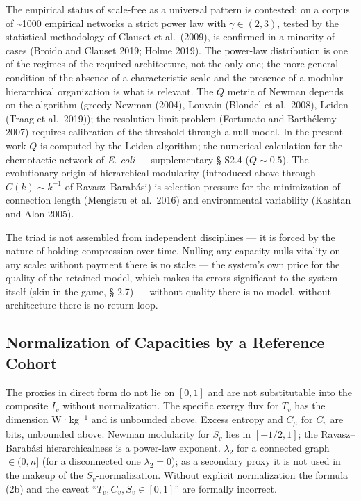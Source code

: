 \documentclass[pdflatex,sn-mathphys-ay]{sn-jnl}
\begin{document}
The empirical status of scale-free as a universal pattern is contested: on a corpus of \textasciitilde1000 empirical networks a strict power law with \(\gamma \in (2, 3)\), tested by the statistical methodology of Clauset et al.~(2009), is confirmed in a minority of cases (Broido and Clauset 2019; Holme 2019). The power-law distribution is one of the regimes of the required architecture, not the only one; the more general condition of the absence of a characteristic scale and the presence of a modular-hierarchical organization is what is relevant. The \(Q\) metric of Newman depends on the algorithm (greedy Newman (2004), Louvain (Blondel et al.~2008), Leiden (Traag et al.~2019)); the resolution limit problem (Fortunato and Barthélemy 2007) requires calibration of the threshold through a null model. In the present work \(Q\) is computed by the Leiden algorithm; the numerical calculation for the chemotactic network of \emph{E. coli} --- supplementary § S2.4 (\(Q \sim 0.5\)). The evolutionary origin of hierarchical modularity (introduced above through \(C(k) \sim k^{-1}\) of Ravasz--Barabási) is selection pressure for the minimization of connection length (Mengistu et al.~2016) and environmental variability (Kashtan and Alon 2005).

The triad is not assembled from independent disciplines --- it is forced by the nature of holding compression over time. Nulling any capacity nulls vitality on any scale: without payment there is no stake --- the system's own price for the quality of the retained model, which makes its errors significant to the system itself (skin-in-the-game, § 2.7) --- without quality there is no model, without architecture there is no return loop.

\subsection{Normalization of Capacities by a Reference Cohort}\label{normalization-of-capacities-by-a-reference-cohort}

The proxies in direct form do not lie on \([0, 1]\) and are not substitutable into the composite \(I_v\) without normalization. The specific exergy flux for \(T_v\) has the dimension W·kg\(^{-1}\) and is unbounded above. Excess entropy and \(C_\mu\) for \(C_v\) are bits, unbounded above. Newman modularity for \(S_v\) lies in \([-1/2, 1]\); the Ravasz--Barabási hierarchicalness is a power-law exponent. \(\lambda_2\) for a connected graph \(\in (0, n]\) (for a disconnected one \(\lambda_2 = 0\)); as a secondary proxy it is not used in the makeup of the \(S_v\)-normalization. Without explicit normalization the formula (2b) and the caveat ``\(T_v, C_v, S_v \in [0, 1]\)'' are formally incorrect.
\end{document}
